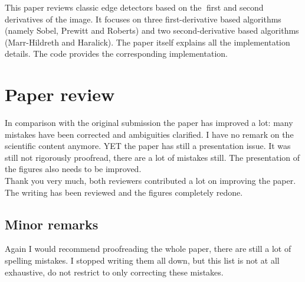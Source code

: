 \documentclass[a4paper,10pt]{report}
\begin{document}
\que This paper reviews classic edge detectors based on the first and second derivatives of the image. It focuses
on three first-derivative based algorithms (namely Sobel, Prewitt and Roberts) and two second-derivative
based algorithms (Marr-Hildreth and Haralick). The paper itself explains all the implementation details.
The code provides the corresponding implementation.\\

\section{Paper review}

\que In comparison with the original submission the paper has improved a lot: many mistakes have been corrected
and ambiguities clarified. I have no remark on the scientific content anymore. YET the paper has still a
presentation issue. It was still not rigorously proofread, there are a lot of mistakes still. The presentation of the figures also needs to be improved.\\

\ans Thank you very much, both reviewers contributed a lot on improving the paper. The writing has been reviewed and the figures completely redone.

\subsection{Minor remarks}
 Again I would recommend proofreading the whole paper, there are still a lot of spelling
mistakes. I stopped writing them all down, but this list is not at all exhaustive, do not restrict to only
correcting these mistakes.
\end{document}
